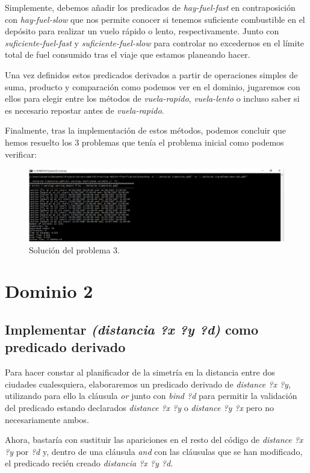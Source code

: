 \documentclass[a4paper, 11pt]{article}
\begin{document}
		Simplemente, debemos añadir los predicados de \textit{hay-fuel-fast} en contraposición con
		\textit{hay-fuel-slow} que nos permite conocer si tenemos suficiente combustible en el depósito
		para realizar un vuelo rápido o lento, respectivamente. Junto con \textit{suficiente-fuel-fast} y
		\textit{suficiente-fuel-slow} para controlar no excedernos en el límite total de fuel consumido tras
		el viaje que estamos planeando hacer.
		
		Una vez definidos estos predicados derivados a partir de operaciones simples de suma, producto y
		comparación como podemos ver en el dominio, jugaremos con ellos para elegir entre los métodos de
		\textit{vuela-rapido}, \textit{vuela-lento} o incluso saber si es necesario repostar antes de
		\textit{vuela-rapido}.
		
		Finalmente, tras la implementación de estos métodos, podemos concluir que hemos resuelto los 3
		problemas que tenía el problema inicial como podemos verificar:
		\begin{figure}[H]
			\centering
			\includegraphics[width=15cm]{Ej1-problema3.png}
			\caption{Solución del problema 3.}
			\label{Prob-3}
		\end{figure}

\section{Dominio 2}
	\subsection{Implementar \textit{(distancia ?x ?y ?d)} como predicado derivado}
		Para hacer constar al planificador de la simetría en la distancia entre dos ciudades
		cualesquiera, elaboraremos un predicado derivado de \textit{distance ?x ?y}, utilizando para
		ello la cláusula \textit{or} junto con \textit{bind ?d} para permitir la validación del predicado
		estando declarados \textit{distance ?x ?y} o \textit{distance ?y ?x} pero no necesariamente ambos.
		
		Ahora, bastaría con sustituir las apariciones en el resto del código de \textit{distance ?x ?y}
		por \textit{?d} y, dentro de una cláusula \textit{and} con las cláusulas que se han modificado,
		el predicado recién creado \textit{distancia ?x ?y ?d}.
		
\end{document}
